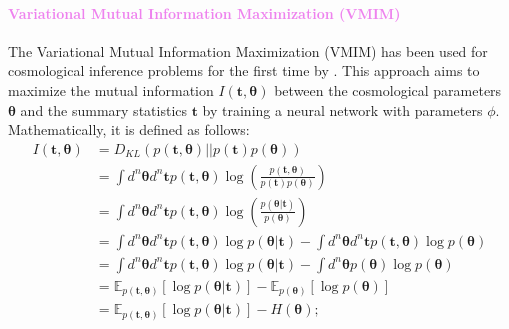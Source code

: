\documentclass{aa}
\begin{document}
\paragraph{\textcolor{violet}{Variational Mutual Information Maximization (VMIM)}}
The Variational Mutual Information Maximization (VMIM) has been used for cosmological inference problems for the first time by \citet{jeffrey2021likelihood}. This approach aims to maximize the mutual information $I(\bm{t}, \bm {\theta})$ between the cosmological parameters $\bm{\theta}$ and the summary statistics $\bm t$ by training a neural network with parameters $\phi$. 
Mathematically, it is defined as follows:
\begin{align}\label{Eq:mutual_information}
    I(\bm{t}, \bm {\theta}) &= D_{KL}(p(\bm {t}, \bm {\theta})||p(\bm {t})p(\bm {\theta})) \\ \nonumber
    &= \int d^n \bm{\theta} d^n \bm{t} p(\bm t, \bm \theta)\log{\left( \frac{ p(\bm {t}, \bm {\theta})}{ p(\bm {t}) p(\bm {\theta})} \right)} \\ \nonumber
    &= \int d^n \bm{\theta} d^n \bm{t} p(\bm t, \bm {\theta})\log{\left( \frac{ p(\bm {\theta} | \bm {t} )}{ p(\bm {\theta})} \right)} \\ \nonumber
        &= \int d^n \bm{\theta} d^n \bm{t} p(\bm t, \bm {\theta})\log{p(\bm {\theta} | \bm {t} )} - \int d^n \bm{\theta}  d^n \bm{t} p(\bm t, \bm {\theta})\log{p(\bm {\theta})} \\ \nonumber
    &= \int d^n \bm{\theta} d^n \bm{t} p(\bm t, \bm {\theta})\log{p(\bm {\theta} | \bm {t} )} - \int d^n \bm{\theta} p(\bm {\theta})\log{p(\bm {\theta})} \\ \nonumber
    &= \mathbb{E}_{p(\bm {t}, \bm {\theta})} [\log{p(\bm {\theta} | \bm {t} )}]- \mathbb{E}_{p(\bm {\theta})} [\log{p(\bm {\theta})}] \\ \nonumber
    &= \mathbb{E}_{p(\bm {t}, \bm {\theta})} [\log{p(\bm {\theta} | \bm {t} )}]- H(\bm {\theta});
\end{align}
\end{document}
